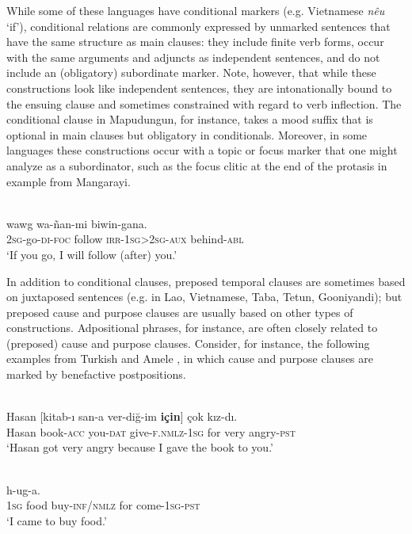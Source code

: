 \documentclass[output=paper]{langsci/langscibook}
\begin{document}
While some of these languages have conditional markers (e.g. Vietnamese \textit{nêu} ‘if’), conditional relations are commonly expressed by unmarked sentences that have the same structure as main clauses: they include finite verb forms, occur with the same arguments and adjuncts as independent sentences, and do not include an (obligatory) subordinate marker. Note, however, that while these constructions look like independent sentences, they are intonationally bound to the ensuing clause and sometimes constrained with regard to verb inflection. The conditional clause in Mapudungun, for instance, takes a mood suffix that is optional in main clauses but obligatory in conditionals. Moreover, in some languages these constructions occur with a topic or focus marker that one might analyze as a subordinator, such as the focus clitic at the end of the protasis in example  from Mangarayi.

\ea\label{ex:diessel:6}
\\
\gll   [ña-yaŋ-gu=\textbf{bayi}]   wawg   wa-ñan-mi  biwin-gana.\\
       \textsc{2sg}-go-\textsc{di-foc}    follow   \textsc{irr-1sg>2sg-aux}  behind-\textsc{abl}\\
\glt   `If you go, I will follow (after) you.'
\z

In addition to conditional clauses, preposed temporal clauses are sometimes based on juxtaposed sentences (e.g. in Lao, Vietnamese, Taba, Tetun, Gooniyandi); but preposed cause and purpose clauses are usually based on other types of constructions. Adpositional phrases, for instance, are often closely related to (preposed) cause and purpose clauses. Consider, for instance, the following examples from Turkish  and Amele , in which cause and purpose clauses are marked by benefactive postpositions. 

\ea\label{ex:diessel:7}
\\
\gll   Hasan   [kitab-ı  san-a  ver-diğ-im  \textbf{için}]  çok  kız-dı.\\
       Hasan  book-\textsc{acc}  you-\textsc{dat}  give-\textsc{f.nmlz-1sg}  for  very  angry-\textsc{pst}  \\
\glt   `Hasan got very angry because I gave the book to you.'
\z

\ea\label{ex:diessel:8}
\\
  h-ug-a.\\
       \textsc{1sg}   food   buy-\textsc{inf/nmlz}  for  come-\textsc{1sg-pst}\\
\glt   `I came to buy food.'
\z
\end{document}
